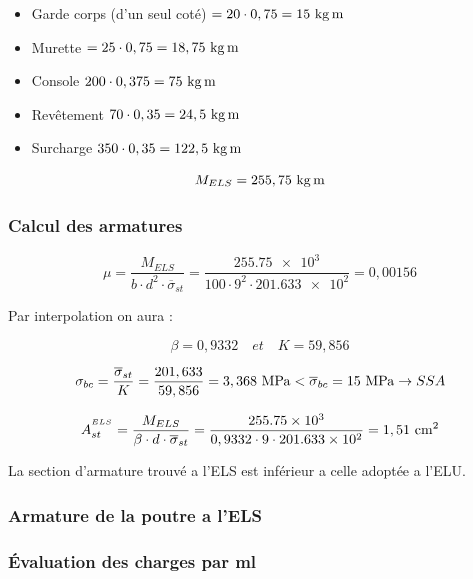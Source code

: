 \documentclass[12pt,a4paper]{article}
\begin{document}
	
	
	
	\begin{itemize}
		\item Garde corps (d'un seul coté) $ = 20 \cdot 0,75 = 15\kgxm$
		\item Murette $ = 25 \cdot 0,75 = 18,75\kgxm$
		\item Console $200 \cdot 0,375 = 75\kgxm$
		\item Revêtement $70 \cdot 0,35 = 24,5\kgxm$
		\item Surcharge $350 \cdot 0,35 = 122,5\kgxm$
	\end{itemize}
	
	\[ M_{ELS} = 255,75\kgxm \]
	
	
	
	\subsubsection{Calcul des armatures}
	
	\[ \mu = \dfrac{M_{ELS}}{b \cdot d^{2} \cdot \overline{\sigma}_{st}} = \dfrac{\num{255,75e3}}{100 \cdot 9^{2} \cdot \num{201,633e2}} = 0,00156 \]
	
	Par interpolation on aura : 
	
	\[ \beta = 0,9332 \quad et \quad K = 59,856 \]
	
	\[ \sigma_{bc} = \dfrac{\overline{\sigma}_{st}}{K} = \dfrac{201,633}{59,856} = 3,368\mpa < \overline{\sigma}_{bc} = 15\mpa \rightarrow SSA \]
	
	
	\[ A_{st}^{^{ELS}} = \dfrac{M_{ELS}}{\beta \cdot d \cdot \overline{\sigma}_{st}} = \dfrac{\num{255,75e3}}{0,9332 \cdot 9 \cdot \num{201,633e2}} = 1,51\cmsq \]
	
	La section d'armature trouvé a l'ELS est inférieur a celle adoptée a l'ELU.
	
	
	
	\subsubsection{Armature de la poutre a l'ELS}
	
	\subsubsection{Évaluation des charges par ml}
	
\end{document}
